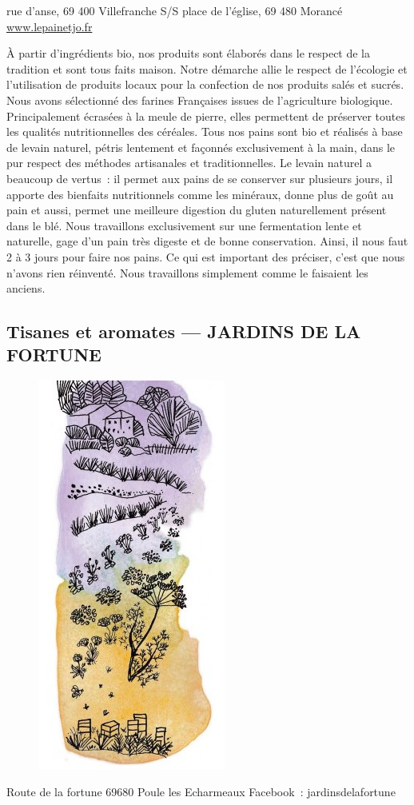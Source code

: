 \documentclass[8pt,a4paper,french]{article}
\makeatletter
\newcommand{\authoredby}[1]{\addtocontents{toc}{\protect\@nameuse{authoredby#1}}}%
\makeatother
\begin{document}
 rue d’anse, 69 400 Villefranche S/S place de l’église, 69 480 Morancé \newline
\href{https://www.lepainetjo.fr}{www.lepainetjo.fr}\newline

\noindent À partir d’ingrédients bio, nos produits sont élaborés dans
le respect de la tradition et sont tous faits maison. Notre démarche
allie le respect de l’écologie et l’utilisation de produits locaux
pour la confection de nos produits salés et sucrés. Nous avons
sélectionné des farines Françaises issues de l’agriculture
biologique. Principalement écrasées à la meule de pierre, elles
permettent de préserver toutes les qualités nutritionnelles des
céréales.  Tous nos pains sont bio et réalisés à base de levain
naturel, pétris lentement et façonnés exclusivement à la main, dans le
pur respect des méthodes artisanales et traditionnelles. Le levain
naturel a beaucoup de vertus\ : il permet aux pains de se conserver sur
plusieurs jours, il apporte des bienfaits nutritionnels comme les
minéraux, donne plus de goût au pain et aussi, permet une meilleure
digestion du gluten naturellement présent dans le blé. Nous
travaillons exclusivement sur une fermentation lente et naturelle,
gage d’un pain très digeste et de bonne conservation. Ainsi, il nous
faut 2 à 3 jours pour faire nos pains. Ce qui est important des
préciser, c’est que nous n’avons rien réinventé. Nous travaillons
simplement comme le faisaient les anciens.

\authoredby{B}
\subsection{Tisanes et aromates --- JARDINS DE LA FORTUNE}\label{subsec:tisanes}

\begin{figure}
\includegraphics[height=0.25\textwidth]{Tisanes1.jpg}
\end{figure}

 Route de la fortune 69680 Poule les  Echarmeaux\newline
Facebook\ : jardinsdelafortune\newline
\end{document}
